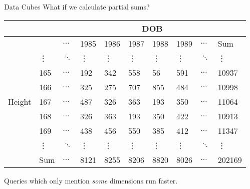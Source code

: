 \documentclass{beamer}
\theoremstyle{definition}
\theoremstyle{definition}
\begin{document}
\begin{frame}{Data Cubes}
    What if we calculate partial sums?
    \begin{table}[h]\footnotesize
        \begin{tabular} { | l | l | l | l | l | l | l | l | l | l |}
        \hline
        & & \multicolumn{8}{|c|}{DOB} \\ \hline
        & & $\hdots$ & 1985 & 1986 & 1987 & 1988 & 1989 & $\hdots$ & Sum \\ \hline
        \multirow{7}{*}{Height}
        & \vdots & $\ddots$ & \vdots & \vdots & \vdots & \vdots & \vdots & $\ddots$ & \vdots \\
        & 165 & $\hdots$ & 192 & 342 & 558 & 56 & 591 & $\hdots$ & 10937 \\
        & 166 & $\hdots$ & 325 & 275 & 707 & 855 & 484 & $\hdots$ & 10998 \\
        & 167 & $\hdots$ & 487 & 326 & 363 & 193 & 350 & $\hdots$ & 11064 \\
        & 168 & $\hdots$ & 326 & 363 & 193 & 350 & 422 & $\hdots$ & 10913 \\
        & 169 & $\hdots$ & 438 & 456 & 550 & 385 & 412 & $\hdots$ & 11347 \\
        & \vdots & $\ddots$ & \vdots & \vdots & \vdots & \vdots & \vdots & $\ddots$ & \vdots \\
        & Sum & $\hdots$ & 8121 & 8255 & 8206 & 8820 & 8026 & $\hdots$ & 202169 \\
        \hline
        \end{tabular}
    \end{table}

    Queries which only mention \textit{some} dimensions run faster.
\end{frame}
\end{document}
